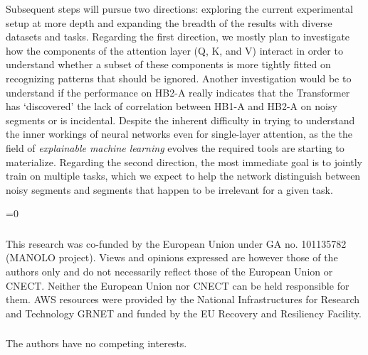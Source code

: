 \documentclass[runningheads]{llncs}
\def\anon{0}
\begin{document}
Subsequent steps will pursue two directions: exploring the current
experimental setup at more depth and expanding the breadth of the
results with diverse datasets and tasks. Regarding the first direction,
we mostly plan to investigate how the components of the attention
layer (Q, K, and V) interact in order to understand whether a subset 
of these components is more tightly fitted on
recognizing patterns that should be ignored. Another investigation
would be to understand if the performance on HB2-A really indicates
that the Transformer has `discovered' the lack of correlation between
HB1-A and HB2-A on noisy segments or is incidental. Despite the
inherent difficulty in trying to understand the inner workings of
neural networks even for single-layer attention, as the the field
of \emph{explainable machine learning} evolves the required tools
are starting to materialize.
%
Regarding the second direction, the most immediate goal is to jointly
train on multiple tasks, which we expect to help the network
distinguish between noisy segments and segments that happen to be
irrelevant for a given task.


\ifnum\anon=0

\begin{credits}
  
\subsubsection{\ackname} This research was co-funded by the European Union
under GA no. 101135782 (MANOLO project). Views and opinions expressed
are however those of the authors only and do not necessarily reflect
those of the European Union or CNECT. Neither the European Union nor
CNECT can be held responsible for them. AWS resources were provided by
the National Infrastructures for Research and Technology GRNET and
funded by the EU Recovery and Resiliency Facility.

\subsubsection{\discintname} The authors have no competing
interests.
\end{credits}

\fi




\end{document}
